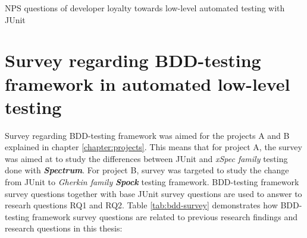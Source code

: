     \vspace{20px}
    \begin{table}[H]
            \caption {NPS questions of developer loyalty towards low-level automated testing with JUnit} \label{tab:junit-pt3}

    \end{table}
    \clearpage
\restoregeometry






\section{Survey regarding BDD-testing framework in automated low-level testing}
\label{section:bdd-survey}
Survey regarding BDD-testing framework was aimed for the projects A and B explained in chapter \ref{chapter:projects}. This means
that for project A, the survey was aimed at to study the differences between JUnit and \textit{xSpec family} testing done with \textbf{\textit{Spectrum}}.
For project B, survey was targeted to study the change from JUnit to \textit{Gherkin family} \textbf{\textit{Spock}} testing framework.
BDD-testing framework survey questions together with base JUnit survey questions are used to answer to researh questions
RQ1 and RQ2. Table \ref{tab:bdd-survey} demonstrates how BDD-testing framework survey questions are related to previous research findings
and research questions in this thesis:


